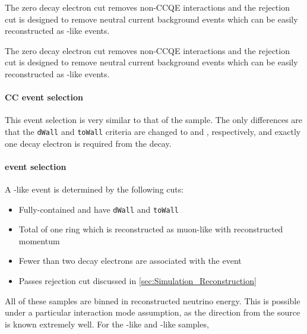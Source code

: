 The zero decay electron	cut removes non-CCQE interactions and the  rejection cut is designed to remove neutral current  background events which can be easily reconstructed as -like events.

The zero decay electron cut removes non-CCQE interactions and the  rejection cut is designed to remove neutral current  background events which can be easily reconstructed as -like events.                 

\paragraph{CC\quickmath{1\pi^{+}} event selection} This event selection is very similar to that of the  sample. The only differences are that the \texttt{dWall} and \texttt{toWall} criteria are changed to  and , respectively, and exactly one decay electron is required from the \quickmath{\pi^{+}} decay. 

\paragraph{ event selection}

A -like event is determined by the following cuts:

\begin{itemize}
\item Fully-contained and have \texttt{dWall}  and \texttt{toWall} 
\item Total of one ring which is reconstructed as muon-like with reconstructed momentum 
\item Fewer than two decay electrons are associated with the event
\item Passes \quickmath{\pi^{+}} rejection cut discussed in \autoref{sec:Simulation_Reconstruction}
\end{itemize}


All of these samples are binned in reconstructed neutrino energy. This is possible under a particular interaction mode assumption, as the direction from the source is known extremely well. For the -like and -like samples,

